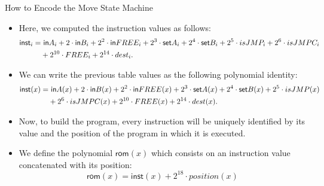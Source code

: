\begin{frame}[allowframebreaks]{How to Encode the Move State Machine}
\normalsize
\begin{itemize}
\item Here, we computed the instruction values as follows:
\begin{align*}
\mathsf{inst}_i = &~\mathsf{in} A_i + 2 \cdot \mathsf{in} B_i + 2^2 \cdot \mathsf{in} FREE_i + 2^3 \cdot \mathsf{set} A_i + 2^4 \cdot \mathsf{set} B_i + 2^5 \cdot isJMP_i + 2^6 \cdot isJMPC_i \\ 
& + 2^{10} \cdot FREE_i + 2^{14} \cdot dest_i.
\end{align*}

\item We can write the previous table values as the following polynomial identity:
\begin{align*}
\mathsf{inst}(x) = &~\mathsf{in} A(x) + 2 \cdot \mathsf{in} B(x) + 2^2 \cdot \mathsf{in} FREE(x) + 2^3 \cdot \mathsf{set} A(x) + 2^4 \cdot \mathsf{set} B(x) + 2^5 \cdot isJMP(x) \\
& + 2^6 \cdot isJMPC(x) + 2^{10} \cdot FREE(x) + 2^{14} \cdot dest(x).
\end{align*}

\item Now, to build the program, every instruction will be uniquely identified by its value and the position of the program in which it is executed.

\item We define the polynomial $\mathsf{rom}(x)$ which consists on an instruction value concatenated with its position:
\[
\mathsf{rom}(x) = \mathsf{inst}(x) + 2^{18} \cdot position(x)
\]
\end{itemize}
\end{frame}










